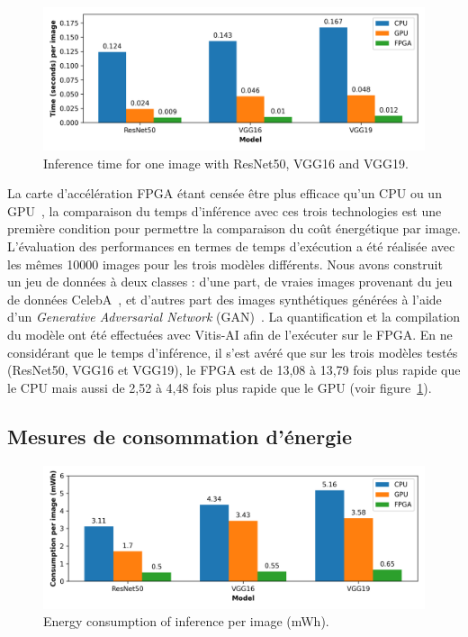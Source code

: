 \begin{figure}[t]
\centering
\includegraphics[width=\columnwidth]{4_Chapitre4/figures/characterization/time_of_inference_1_image.png}
\caption{Inference time for one image with ResNet50, VGG16 and VGG19.}
\label{figure:herofake-time-inference}
\end{figure}

La carte d'accélération FPGA étant censée être plus efficace qu'un CPU ou un GPU~\cite{5272532}, la comparaison du temps d'inférence avec ces trois technologies est une première condition pour permettre la comparaison du coût énergétique par image. L'évaluation des performances en termes de temps d'exécution a été réalisée avec les mêmes 10000 images pour les trois modèles différents. Nous avons construit un jeu de données à deux classes : d'une part, de vraies images provenant du jeu de données CelebA~\cite{https://doi.org/10.48550/arxiv.1411.7766}, et d'autres part des images synthétiques générées à l'aide d'un \textit{Generative Adversarial Network} (GAN)~\cite{jimaging7080128}. La quantification et la compilation du modèle ont été effectuées avec Vitis-AI afin de l'exécuter sur le FPGA. En ne considérant que le temps d'inférence, il s'est avéré que sur les trois modèles testés (ResNet50, VGG16 et VGG19), le FPGA est de 13,08 à 13,79 fois plus rapide que le CPU mais aussi de 2,52 à 4,48 fois plus rapide que le GPU (voir figure~\ref{figure:herofake-time-inference}).

\subsection{Mesures de consommation d'énergie}

\begin{figure}[t]
\centering
\includegraphics[width=\columnwidth]{4_Chapitre4/figures/characterization/consumption_per_image.png}
\caption{Energy consumption of inference per image (mWh).}
\label{figure:herofake-consumption-per-image}
\end{figure}

